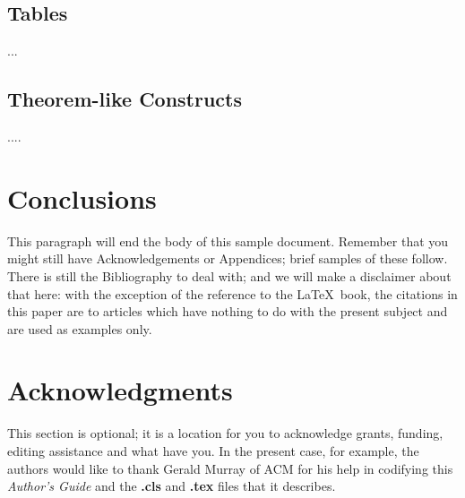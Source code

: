 \documentclass{sigkddExp}
\begin{document}
\subsection{Tables}
...

\subsection{Theorem-like Constructs}
....



\section{Conclusions}
This paragraph will end the body of this sample document.
Remember that you might still have Acknowledgements or
Appendices; brief samples of these
follow.  There is still the Bibliography to deal with; and
we will make a disclaimer about that here: with the exception
of the reference to the \LaTeX\ book, the citations in
this paper are to articles which have nothing to
do with the present subject and are used as
examples only.



\section{Acknowledgments}
This section is optional; it is a location for you
to acknowledge grants, funding, editing assistance and
what have you.  In the present case, for example, the
authors would like to thank Gerald Murray of ACM for
his help in codifying this \textit{Author's Guide}
and the \textbf{.cls} and \textbf{.tex} files that it describes.




 



\end{document}
